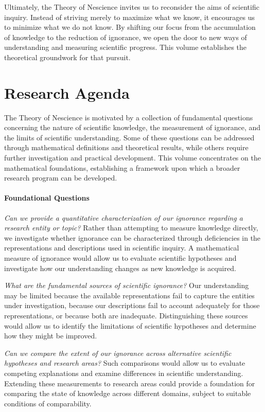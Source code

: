 Ultimately, the Theory of Nescience invites us to reconsider the aims of scientific inquiry. Instead of striving merely to maximize what we know, it encourages us to minimize what we do not know. By shifting our focus from the accumulation of knowledge to the reduction of ignorance, we open the door to new ways of understanding and measuring scientific progress. This volume establishes the theoretical groundwork for that pursuit.


\section*{Research Agenda}

The Theory of Nescience is motivated by a collection of fundamental questions concerning the nature of scientific knowledge, the measurement of ignorance, and the limits of scientific understanding. Some of these questions can be addressed through mathematical definitions and theoretical results, while others require further investigation and practical development. This volume concentrates on the mathematical foundations, establishing a framework upon which a broader research program can be developed.

\paragraph{Foundational Questions}

\emph{Can we provide a quantitative characterization of our ignorance regarding a research entity or topic?} Rather than attempting to measure knowledge directly, we investigate whether ignorance can be characterized through deficiencies in the representations and descriptions used in scientific inquiry. A mathematical measure of ignorance would allow us to evaluate scientific hypotheses and investigate how our understanding changes as new knowledge is acquired.

\emph{What are the fundamental sources of scientific ignorance?} Our understanding may be limited because the available representations fail to capture the entities under investigation, because our descriptions fail to account adequately for those representations, or because both are inadequate. Distinguishing these sources would allow us to identify the limitations of scientific hypotheses and determine how they might be improved.

\emph{Can we compare the extent of our ignorance across alternative scientific hypotheses and research areas?} Such comparisons would allow us to evaluate competing explanations and examine differences in scientific understanding. Extending these measurements to research areas could provide a foundation for comparing the state of knowledge across different domains, subject to suitable conditions of comparability.

